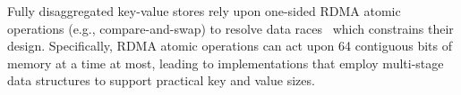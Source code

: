 %
%
%
Fully disaggregated key-value stores rely upon one-sided RDMA atomic
operations (e.g., compare-and-swap) to resolve data
races~\cite{rolex,fusee,race} which constrains their design.
Specifically, RDMA atomic operations can act upon 64 contiguous bits
of memory at a time at most, leading to implementations that employ
multi-stage data structures to support practical key and value sizes.

